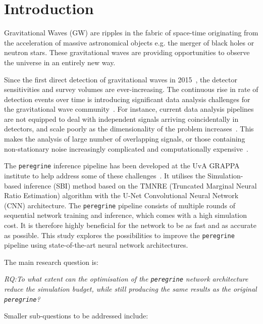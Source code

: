\section{Introduction}
\label{sec:introduction}

Gravitational Waves (GW) are ripples in the fabric of space-time originating from the acceleration of massive astronomical objects e.g. the merger of black holes or neutron stars. These gravitational waves are providing opportunities to observe the universe in an entirely new way.

Since the first direct detection of gravitational waves in 2015~\cite{LIGO_2016}, the detector sensitivities and survey volumes are ever-increasing. The continuous rise in rate of detection events over time is introducing significant data analysis challenges for the gravitational wave community~\cite{bhardwaj2023peregrine}.
For instance, current data analysis pipelines are not equipped to deal with independent signals arriving coincidentally in detectors, and scale poorly as the dimensionality of the problem increases~\cite{alvey2023things}. This makes the analysis of large number of overlapping signals, or those containing non-stationary noise increasingly complicated and computationally expensive~\cite{bhardwaj2023peregrine}.

The \texttt{peregrine} inference pipeline has been developed at the UvA GRAPPA institute to help address some of these challenges~\cite{bhardwaj2023peregrine}. It utilises the Simulation-based inference (SBI) method based on the TMNRE (Truncated Marginal Neural Ratio Estimation) algorithm with the U-Net Convolutional Neural Network (CNN) architecture. The \texttt{peregrine} pipeline consists of multiple rounds of sequential network training and inference, which comes with a high simulation cost. It is therefore highly beneficial for the network to be as fast and as accurate as possible. This study explores the possibilities to improve the \texttt{peregrine} pipeline using state-of-the-art neural network architectures.

The main research question is: 

\noindent \textit{RQ:To what extent can the optimisation of the \texttt{peregrine} network architecture reduce the simulation budget, while still producing the same results as the original \texttt{peregrine}?}

Smaller sub-questions to be addressed include:

